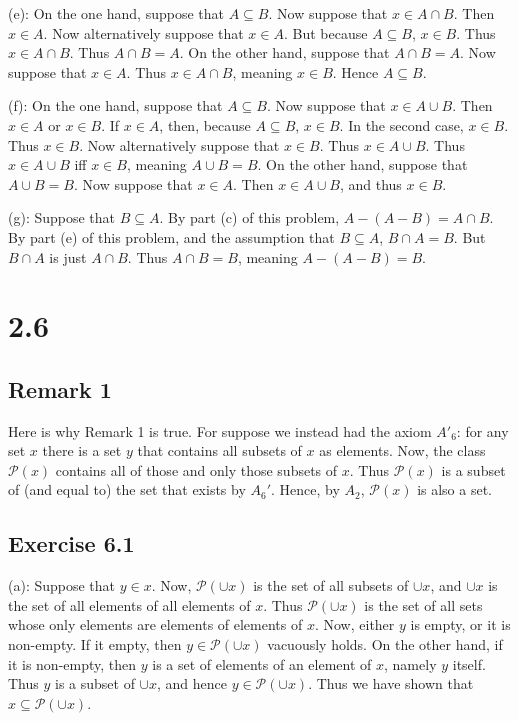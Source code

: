 \documentclass{article}
\theoremstyle{definition}
\begin{document}
(e): On the one hand, suppose that $A\subseteq B$. Now suppose that $x\in A\cap B$. Then $x\in A$. Now alternatively suppose that $x\in A$. 
But because $A\subseteq B$, $x\in B$. Thus $x\in A\cap B$. Thus $A\cap B=A$. On the other hand, suppose that $A\cap B=A$. Now suppose that $x\in A$. 
Thus $x\in A\cap B$, meaning $x\in B$. Hence $A\subseteq B$.


(f): On the one hand, suppose that $A\subseteq B$. Now suppose that $x\in A\cup B$. Then $x\in A$ or $x\in B$. If $x\in A$, then, because 
$A\subseteq B$, $x\in B$. In the second case, $x\in B$. Thus $x\in B$. Now alternatively suppose that $x\in B$. Thus $x\in A\cup B$. Thus 
$x\in A\cup B$ iff $x\in B$, meaning $A\cup B=B$. On the other hand, suppose that $A\cup B=B$. Now suppose that $x\in A$. Then 
$x\in A\cup B$, and thus $x\in B$.


(g): Suppose that $B\subseteq A$. By part (c) of this problem, $A-(A-B)=A\cap B$. By part (e) of this problem, and the assumption that $B\subseteq A$, $B\cap A=B$. But 
$B\cap A$ is just $A\cap B$. Thus $A\cap B=B$, meaning $A-(A-B)=B$.

\section*{2.6}

\subsection*{Remark 1}
Here is why Remark 1 is true. For suppose we instead had the axiom $A'_6$: for any set $x$ there is a set $y$ that contains all subsets of $x$ as elements. 
Now, the class $\mathcal{P}(x)$ contains all of those and only those subsets of $x$. Thus $\mathcal{P}(x)$ is a subset of (and equal to) 
the set that exists by $A_6'$. Hence, by $A_2$, $\mathcal{P}(x)$ is also a set.

\subsection*{Exercise 6.1}
(a): Suppose that $y\in x$. Now, $\mathcal{P}(\cup x)$ is the set of all subsets of $\cup x$, and $\cup x$ is the set of all elements of all elements of 
$x$. Thus $\mathcal{P}(\cup x)$ is the set of all sets whose only elements are elements of elements of $x$. Now, either $y$ is empty, or it is non-empty. If 
it empty, then $y\in\mathcal{P}(\cup x)$ vacuously holds. On the other hand, if it is non-empty, then $y$ is a set of elements of an element of $x$, namely $y$ itself. 
Thus $y$ is a subset of $\cup x$, and hence $y\in\mathcal{P}(\cup x)$. Thus we have shown that $x\subseteq\mathcal{P}(\cup x)$.
\end{document}
